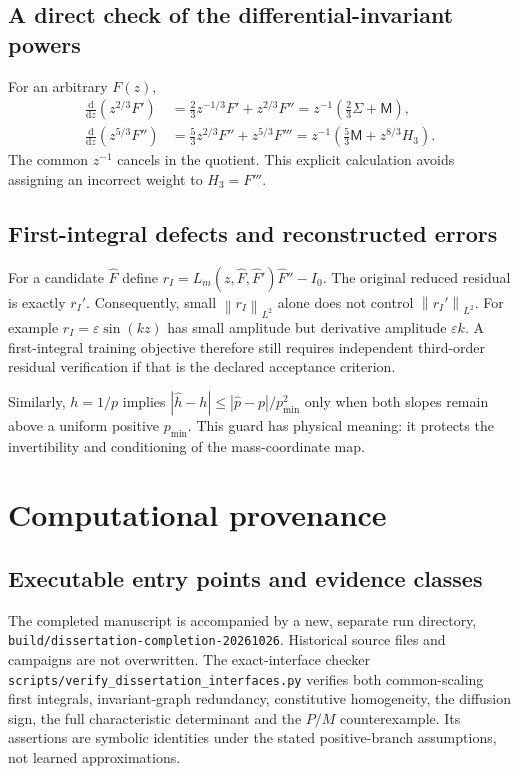 \documentclass[11pt,a4paper,oneside]{report}
\numberwithin{equation}{chapter}
\newcommand{\dd}{\mathrm d}
\newcommand{\norm}[1]{\left\lVert#1\right\rVert}
\DeclareRobustCommand{\code}[1]{\nolinkurl{#1}}
\begin{document}
\section{A direct check of the differential-invariant powers}
For an arbitrary $F(z)$,
\begin{align}
\frac{\dd}{\dd z}(z^{2/3}F')
 &=\tfrac23z^{-1/3}F'+z^{2/3}F''
 =z^{-1}(\tfrac23\Sigma+\mathsf M),\\
\frac{\dd}{\dd z}(z^{5/3}F'')
 &=\tfrac53z^{2/3}F''+z^{5/3}F'''
 =z^{-1}(\tfrac53\mathsf M+z^{8/3}H_3).
\end{align}
The common $z^{-1}$ cancels in the quotient. This explicit calculation avoids assigning an incorrect weight to $H_3=F'''$.

\section{First-integral defects and reconstructed errors}
For a candidate $\widehat F$ define $r_I=L_m(z,\widehat F,\widehat F')\widehat F''-I_0$. The original reduced residual is exactly $r_I'$. Consequently, small $\norm{r_I}_{L^2}$ alone does not control $\norm{r_I'}_{L^2}$. For example $r_I=\varepsilon\sin(kz)$ has small amplitude but derivative amplitude $\varepsilon k$. A first-integral training objective therefore still requires independent third-order residual verification if that is the declared acceptance criterion.

Similarly, $h=1/p$ implies
$|\widehat h-h|\le|\widehat p-p|/p_{\min}^2$ only when both slopes remain above a uniform positive $p_{\min}$. This guard has physical meaning: it protects the invertibility and conditioning of the mass-coordinate map.

\chapter{Computational provenance}\label{app:repro}
\section{Executable entry points and evidence classes}
The completed manuscript is accompanied by a new, separate run directory,
\code{build/dissertation-completion-20261026}. Historical source files and
campaigns are not overwritten. The exact-interface checker
\code{scripts/verify_dissertation_interfaces.py} verifies both common-scaling
first integrals, invariant-graph redundancy, constitutive homogeneity,
the diffusion sign, the full characteristic determinant and the $P/M$
counterexample. Its assertions are symbolic identities under the stated
positive-branch assumptions, not learned approximations.
\end{document}
